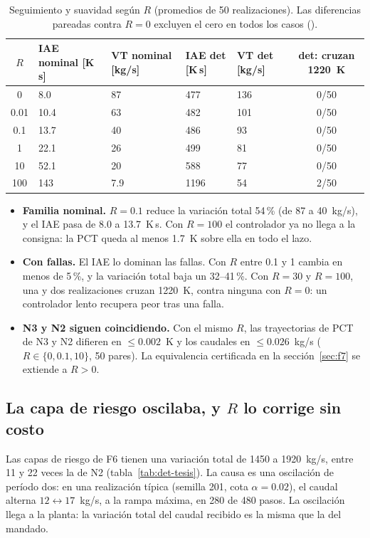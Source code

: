 \begin{table}[H]\centering\small
\begin{tabularx}{\linewidth}{@{}c Y Y Y Y c@{}}\toprule
$R$ & IAE nominal [K\,s] & VT nominal [kg/s] & IAE det [K\,s] & VT det [kg/s] & det: cruzan 1220~K\\ & 8.0 & 87 & 477 & 136 & 0/50\\
0.01 & 10.4 & 63 & 482 & 101 & 0/50\\
0.1 & 13.7 & 40 & 486 & 93 & 0/50\\
1 & 22.1 & 26 & 499 & 81 & 0/50\\
10 & 52.1 & 20 & 588 & 77 & 0/50\\
100 & 143 & 7.9 & 1196 & 54 & 2/50\\\bottomrule
\end{tabularx}
\caption{Seguimiento y suavidad según $R$ (promedios de 50 realizaciones). Las diferencias
pareadas contra $R=0$ excluyen el cero en todos los casos ().}
\label{tab:f8}
\end{table}

\begin{itemize}
  \item \textbf{Familia nominal.} $R=0.1$ reduce la variación total 54\,\% (de 87 a 40~kg/s), y
        el IAE pasa de 8.0 a 13.7~K\,s. Con $R=100$ el controlador ya no llega a la consigna: la
        PCT queda al menos 1.7~K sobre ella en todo el lazo.
  \item \textbf{Con fallas.} El IAE lo dominan las fallas. Con $R$ entre 0.1 y 1 cambia en menos de
        5\,\%, y la variación total baja un 32--41\,\%. Con $R=30$ y $R=100$, una y dos
        realizaciones cruzan 1220~K, contra ninguna con $R=0$: un controlador lento recupera
        peor tras una falla.
  \item \textbf{N3 y N2 siguen coincidiendo.} Con el mismo $R$, las trayectorias de PCT de N3 y
        N2 difieren en $\le0.002$~K y los caudales en $\le0.026$~kg/s ($R\in\{0,0.1,10\}$, 50
        pares). La equivalencia certificada en la sección~\ref{sec:f7} se
        extiende a $R>0$.
\end{itemize}

\subsection{La capa de riesgo oscilaba, y $R$ lo corrige sin costo}
Las capas de riesgo de F6 tienen una variación total de 1450 a 1920~kg/s, entre 11 y 22 veces la
de N2 (tabla~\ref{tab:det-tesis}). La causa es una oscilación de período dos: en una
realización típica (semilla 201, cota $\alpha=0.02$), el caudal alterna
$12\leftrightarrow17$~kg/s, a la rampa máxima, en 280 de 480 pasos. La oscilación llega a la
planta: la variación total del caudal recibido es la misma que la del mandado.

